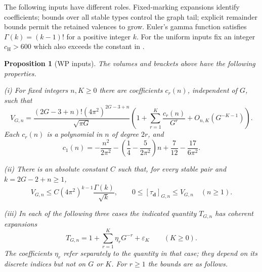 \documentclass[a4paper,10pt]{article}
\numberwithin{equation}{section}
\theoremstyle{paperplain}
\newtheorem{prp}[thm]{Proposition}
\theoremstyle{paperremark}
\theoremstyle{paperplain}
\begin{document}
The following inputs have different roles. Fixed-marking expansions
identify coefficients; bounds over all stable types control the graph
tail; explicit remainder bounds permit the retained valences to grow.
Euler's gamma function satisfies $\Gamma(k)=(k-1)!$ for a positive
integer $k$.
For the uniform inputs fix an integer $c_{\mathrm H}>600$ which also
exceeds the constant in \cite[Lemma~2.6]{HMT25}.

\begin{prp}[WP inputs]
\label{prp:s03:wp-inputs}
The volumes and brackets above have the following properties.

\textup{(i)} For fixed integers $n,K\geq0$ there are coefficients
$c_r(n)$, independent of $G$, such that
\begin{equation}
\label{eq:s03:fixed-n-volume}
V_{G,n}
=\frac{(2G-3+n)!(4\pi^2)^{2G-3+n}}{\sqrt{\pi G}}
 \left(1+\sum_{r=1}^K\frac{c_r(n)}{G^r}
 +O_{n,K}(G^{-K-1})\right).
\end{equation}
Each $c_r(n)$ is a polynomial in $n$ of degree $2r$, and
\begin{equation}
\label{eq:s03:c-one}
c_1(n)=-\frac{n^2}{2\pi^2}
-\left(\frac14-\frac{5}{2\pi^2}\right)n
+\frac7{12}-\frac{17}{6\pi^2}.
\end{equation}

\textup{(ii)} There is an absolute constant $C$ such that, for every
stable pair and $k=2G-2+n\geq1$,
\begin{equation}
\label{eq:s03:all-type-input}
V_{G,n}\leq C(4\pi^2)^{k-1}\frac{\Gamma(k)}{\sqrt{k}},
\qquad
0\leq[\tau_{\mathbf d}]_{G,n}\leq V_{G,n}\quad(n\geq1).
\end{equation}

\textup{(iii)} In each of the following three cases the indicated
quantity $T_{G,n}$ has coherent expansions
\begin{equation}
\label{eq:s03:hmt-form}
T_{G,n}=1+\sum_{r=1}^K\eta_rG^{-r}+\varepsilon_K
\qquad(K\geq0).
\end{equation}
The coefficients $\eta_r$ refer separately to the quantity in that case;
they depend on its discrete indices but not on $G$ or $K$.
For $r\geq1$ the bounds are as follows.


\end{prp}
\end{document}
